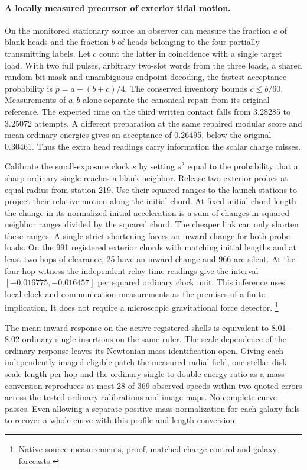 \documentclass[11pt]{article}
\begin{document}
\paragraph{A locally measured precursor of exterior tidal motion.}
On the monitored stationary source an observer can measure the fraction
\(a\) of blank heads and the fraction \(b\) of heads belonging to the
four partially transmitting labels. Let \(c\) count the latter in
coincidence with a single target load. With two full pulses, arbitrary
two-slot words from the three loads, a shared random bit mask and
unambiguous endpoint decoding, the fastest acceptance probability
is \(p=a+(b+c)/4\). The conserved inventory bounds \(c\le b/60\).
Measurements of \(a,b\) alone separate the canonical repair from
its original reference. The expected time on the third written
contact falls from 3.28285 to 3.25072 attempts. A different
preparation at the same repaired modular score and mean ordinary
energies gives an acceptance of 0.26495, below the original 0.30461.
Thus the extra head readings carry information the scalar charge misses.

Calibrate the small-exposure clock \(s\) by setting \(s^2\) equal to
the probability that a sharp ordinary single reaches a blank neighbor.
Release two exterior probes at equal radius from station 219.
Use their squared ranges to the launch stations to project their
relative motion along the initial chord.
At fixed initial chord length the change in its normalized initial
acceleration is a sum of changes in squared neighbor ranges divided
by the squared chord. The cheaper link can only shorten these
ranges. A single strict shortening forces an inward change for both
probe loads. On the 991 registered exterior chords with matching
initial lengths and at least two hops of clearance, 25 have an
inward change and 966 are silent. At the four-hop witness the
independent relay-time readings give the interval
\([-0.016775,-0.016457]\) per squared ordinary clock unit.
This inference uses local clock and communication measurements as
the premises of a finite implication. It does not require a
microscopic gravitational force detector.%
\footnote{\href{https://github.com/FloatingPragma/observer-patch-holography/blob/main/model/experiments/interval_echo_shell_flux/product_address/green_response/material_recoil/overlap_source/native_boundary/stock/aperture/TIDAL_RESULTS.md}{Native source measurements, proof, matched-charge control and galaxy forecasts}.}

The mean inward response on the active registered shells is equivalent
to 8.01--8.02 ordinary single insertions on the same ruler. The scale
dependence of the ordinary response leaves its Newtonian mass
identification open. Giving each independently imaged eligible patch
the measured radial field, one stellar disk scale length per hop and
the ordinary single-to-double energy ratio as a mass conversion
reproduces at most 28 of 369 observed speeds within two quoted
errors across the tested ordinary calibrations and image maps.
No complete curve passes. Even allowing a separate positive mass
normalization for each galaxy fails to recover a whole curve with
this profile and length conversion.
\end{document}
